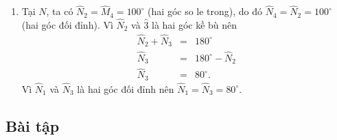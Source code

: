 \begin{vd}
{\begin{enumerate}[TH1.]
\begin{eqnarray*}
				\widehat{M}_{3}&=&180^{\circ}-\widehat{M}_{2}\\
				\widehat{M}_{3}&=&80^{\circ}.
			\end{eqnarray*}
			Vì $ \widehat{M}_{1}$ và $\widehat{M}_{3} $ là hai góc đối đỉnh nên $ \widehat{M}_{1}=\widehat{M}_{3}=80^{\circ} $.
			\item Tại $ N $, ta có $ \widehat{N}_{2}=\widehat{M}_{4}=100^{\circ} $ (hai góc so le trong), do đó $ \widehat{N}_{4}=\widehat{N}_{2}=100^{\circ} $ (hai góc đối đỉnh). Vì $ \widehat{N}_{2} $ và $ \widehat{3} $ là hai góc kề bù nên
			\begin{eqnarray*}
				\widehat{N}_{2}+\widehat{N}_{3}&=&180^{\circ}\\
				\widehat{N}_{3}&=&180^{\circ}-\widehat{N}_{2}\\
				\widehat{N}_{3}&=&80^{\circ}.
			\end{eqnarray*}
			Vì $ \widehat{N}_{1}$ và $\widehat{N}_{3} $ là hai góc đối đỉnh nên $ \widehat{N}_{1}=\widehat{N}_{3}=80^{\circ} $.
		\end{enumerate}
	}
\end{vd}
\subsection{Bài tập}

